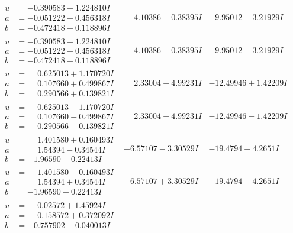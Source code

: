 \documentclass[1p]{elsarticle_modified}
\theoremstyle{definition}
\begin{document}
$$\begin{array}{c|c|c}
\begin{aligned}
u &= -0.390583 + 1.224810 I \\
a &= -0.051222 + 0.456318 I \\
b &= -0.472418 + 0.118896 I\end{aligned}
 & \phantom{-}4.10386 - 0.38395 I & -9.95012 + 3.21929 I \\ \hline\begin{aligned}
u &= -0.390583 - 1.224810 I \\
a &= -0.051222 - 0.456318 I \\
b &= -0.472418 - 0.118896 I\end{aligned}
 & \phantom{-}4.10386 + 0.38395 I & -9.95012 - 3.21929 I \\ \hline\begin{aligned}
u &= \phantom{-}0.625013 + 1.170720 I \\
a &= \phantom{-}0.107660 + 0.499867 I \\
b &= \phantom{-}0.290566 + 0.139821 I\end{aligned}
 & \phantom{-}2.33004 - 4.99231 I & -12.49946 + 1.42209 I \\ \hline\begin{aligned}
u &= \phantom{-}0.625013 - 1.170720 I \\
a &= \phantom{-}0.107660 - 0.499867 I \\
b &= \phantom{-}0.290566 - 0.139821 I\end{aligned}
 & \phantom{-}2.33004 + 4.99231 I & -12.49946 - 1.42209 I \\ \hline\begin{aligned}
u &= \phantom{-}1.401580 + 0.160493 I \\
a &= \phantom{-}1.54394 - 0.34544 I \\
b &= -1.96590 - 0.22413 I\end{aligned}
 & -6.57107 - 3.30529 I & -19.4794 + 4.2651 I \\ \hline\begin{aligned}
u &= \phantom{-}1.401580 - 0.160493 I \\
a &= \phantom{-}1.54394 + 0.34544 I \\
b &= -1.96590 + 0.22413 I\end{aligned}
 & -6.57107 + 3.30529 I & -19.4794 - 4.2651 I \\ \hline\begin{aligned}
u &= \phantom{-}0.02572 + 1.45924 I \\
a &= \phantom{-}0.158572 + 0.372092 I \\
b &= -0.757902 - 0.040013 I\end{aligned}

\end{array}$$
\end{document}
